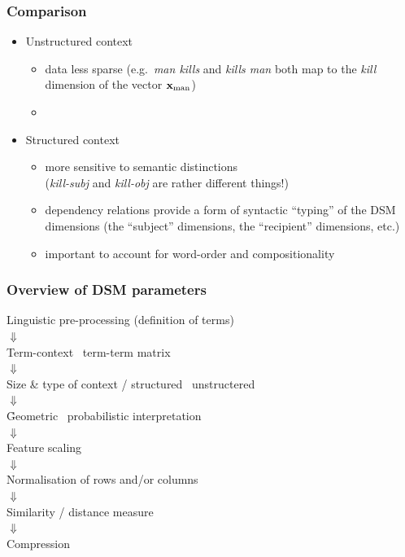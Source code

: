 \begin{frame}
  \frametitle{Comparison}

  \begin{itemize}
  \item Unstructured context
    \begin{itemize}
    \item data less sparse (e.g.\ \emph{man kills} and \emph{kills man} both
      map to the \emph{kill} dimension of the vector $\vx_{\text{man}}$)
    \item[]
    \end{itemize}
  \item Structured context
    \begin{itemize}
    \item more sensitive to semantic distinctions\\
      (\emph{kill-subj} and \emph{kill-obj} are rather different
      things!)
    \item dependency relations provide a form of syntactic ``typing''
      of the DSM dimensions (the ``subject'' dimensions, the
      ``recipient'' dimensions, etc.)
     \item important to account for word-order and compositionality 
    \end{itemize}
  \end{itemize}
\end{frame}

\begin{frame}
  \frametitle{Overview of DSM parameters}

  \ungap[1]
  \begin{center}
    Linguistic pre-processing (definition of terms)\\
    $\Downarrow$\\
    Term-context \vs\ term-term matrix\\
    $\Downarrow$\\
    Size \& type of context / structured \vs\ unstructered\\
    $\Downarrow$\\
    \h{Geometric \vs\ probabilistic interpretation}\\
    $\Downarrow$\\
    Feature scaling\\
    $\Downarrow$\\
    Normalisation of rows and/or columns\\
    $\Downarrow$\\
    Similarity / distance measure\\
    $\Downarrow$\\
    Compression
  \end{center}
\end{frame}


